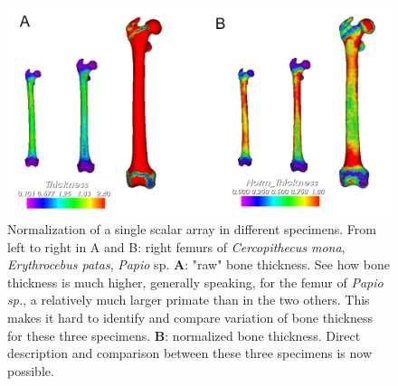 \begin{figure}
  \centering
  \includegraphics[scale=0.4]{images/11/normalization_example2.png} 
	\caption{ 
Normalization of a single scalar array in different specimens. From left to right in A and B: right femurs of \textit{Cercopithecus mona}, \textit{Erythrocebus patas}, \textit{Papio} sp.   \textbf{A}: "raw" bone thickness. See how bone thickness is much higher, generally speaking, for the femur of \textit{Papio sp.}, a relatively much larger primate than in the two others. This makes it hard to identify and compare variation of bone thickness for these three specimens. \textbf{B}: normalized bone thickness. Direct description and comparison between these three specimens is now possible. 	
	}
\label{normalization_example2}
\end{figure}

